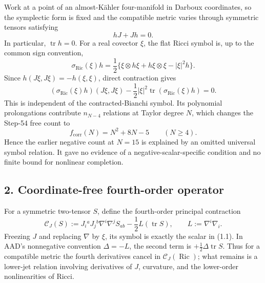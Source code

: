 \documentclass[
  10pt,
]{report}
\begin{document}
Work at a point of an almost-Kähler four-manifold in Darboux
coordinates, so the symplectic form is fixed and the compatible metric
varies through symmetric tensors satisfying \[
hJ+Jh=0.
\] In particular, \(\operatorname{tr}h=0\). For a real covector \(\xi\),
the flat Ricci symbol is, up to the common sign convention, \[
\sigma_{\mathrm{Ric}}(\xi)h
=\frac12\{\xi\otimes h\xi+h\xi\otimes\xi-|\xi|^2h\}.
\] Since \(h(J\xi,J\xi)=-h(\xi,\xi)\), direct contraction gives \[
\boxed{
(\sigma_{\mathrm{Ric}}(\xi)h)(J\xi,J\xi)
-\frac12|\xi|^2\operatorname{tr}(\sigma_{\mathrm{Ric}}(\xi)h)=0.}
\tag{1.1}
\] This is independent of the contracted-Bianchi symbol. Its polynomial
prolongations contribute \(n_{N-4}\) relations at Taylor degree \(N\),
which changes the Step-54 free count to \[
f_{\mathrm{corr}}(N)=N^2+8N-5\qquad(N\ge4).
\] Hence the earlier negative count at \(N=15\) is explained by an
omitted universal symbol relation. It gave no evidence of a
negative-scalar-specific condition and no finite bound for nonlinear
completion.

\hypertarget{coordinate-free-fourth-order-operator}{%
\subsection{2. Coordinate-free fourth-order
operator}\label{coordinate-free-fourth-order-operator}}

For a symmetric two-tensor \(S\), define the fourth-order principal
contraction \[
\mathcal C_J(S)
:=J_i{}^aJ_j{}^b\nabla^i\nabla^jS_{ab}
-\frac12L(\operatorname{tr}S),
\qquad L:=\nabla^i\nabla_i.
\tag{2.1}
\] Freezing \(J\) and replacing \(\nabla\) by \(\xi\), its symbol is
exactly the scalar in (1.1). In AAD's nonnegative convention
\(\Delta=-L\), the second term is \(+\frac12\Delta\operatorname{tr}S\).
Thus for a compatible metric the fourth derivatives cancel in
\(\mathcal C_J(\operatorname{Ric})\); what remains is a lower-jet
relation involving derivatives of \(J\), curvature, and the lower-order
nonlinearities of Ricci.
\end{document}
